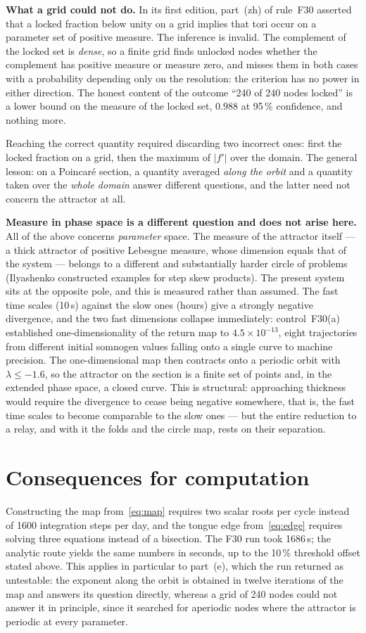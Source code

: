 \documentclass[11pt,a4paper]{article}
\begin{document}
\textbf{What a grid could not do.} In its first edition, part~(zh) of rule~F30 asserted that a
locked fraction below unity on a grid implies that tori occur on a parameter set of positive
measure. The inference is invalid. The complement of the locked set is \emph{dense}, so a finite
grid finds unlocked nodes whether the complement has positive measure or measure zero, and misses
them in both cases with a probability depending only on the resolution: the criterion has no power
in either direction. The honest content of the outcome ``240 of 240 nodes locked'' is a lower bound
on the measure of the locked set, $0.988$ at 95\,\% confidence, and nothing more.

Reaching the correct quantity required discarding two incorrect ones: first the locked fraction on a
grid, then the maximum of $|f'|$ over the domain. The general lesson: on a Poincar\'e section, a
quantity averaged \emph{along the orbit} and a quantity taken over the \emph{whole domain} answer
different questions, and the latter need not concern the attractor at all.

\textbf{Measure in phase space is a different question and does not arise here.} All of the above
concerns \emph{parameter} space. The measure of the attractor itself --- a thick attractor of
positive Lebesgue measure, whose dimension equals that of the system --- belongs to a different and
substantially harder circle of problems (Ilyashenko constructed examples for step skew products).
The present system sits at the opposite pole, and this is measured rather than assumed. The fast
time scales (10\,s) against the slow ones (hours) give a strongly negative divergence, and the two
fast dimensions collapse immediately: control~F30(a) established one-dimensionality of the return
map to $4.5\times10^{-13}$, eight trajectories from different initial somnogen values falling onto a
single curve to machine precision. The one-dimensional map then contracts onto a periodic orbit with
$\lambda\le-1.6$, so the attractor on the section is a finite set of points and, in the extended
phase space, a closed curve. This is structural: approaching thickness would require the divergence
to cease being negative somewhere, that is, the fast time scales to become comparable to the slow
ones --- but the entire reduction to a relay, and with it the folds and the circle map, rests on
their separation.

\section{Consequences for computation}
Constructing the map from~\eqref{eq:map} requires two scalar roots per cycle instead of 1600
integration steps per day, and the tongue edge from~\eqref{eq:edge} requires solving three equations
instead of a bisection. The F30 run took 1686\,s; the analytic route yields the same numbers in
seconds, up to the 10\,\% threshold offset stated above. This applies in particular to part~(e),
which the run returned as untestable: the exponent along the orbit is obtained in twelve iterations
of the map and answers its question directly, whereas a grid of 240 nodes could not answer it in
principle, since it searched for aperiodic nodes where the attractor is periodic at every parameter.
\end{document}
